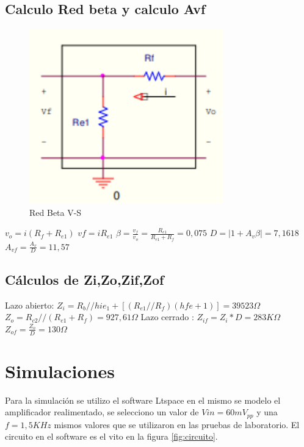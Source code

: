 \documentclass[12pt, letterpaper]{article}
\begin{document}
\subsection{Calculo Red beta y calculo Avf}
\begin{figure}[H]
	\centering
	\includegraphics[width=0.75\textwidth]{Imagenes/Screenshot_58.png}
	\caption{Red Beta  V-S}
	\label{fig:Red_beta}
\end{figure}
\singlespacing
$v_o=i(R_f+R_{e1})$ \hspace{1cm} $vf=iR_{e1}$
\singlespacing
$\beta = \frac{v_f}{v_o}=\frac{R_{e1}}{R_{e1}+R_f}=0,075$
\singlespacing
$D=|1+A_v\beta|=7,1618$ \hspace{1cm} $A_{vf}=\frac{A_v}{D}=11,57$
\subsection{Cálculos de Zi,Zo,Zif,Zof}
Lazo abierto:
$Z_i=R_b//{hie_1+[(R_{e1}//R_f)(hfe+1)]}=39523\Omega$
\singlespacing
$Z_o=R_{c2}//(R_{e1}+R_f)=927,61\Omega$
\singlespacing
Lazo cerrado :
$Z_{if}=Z_i*D=283K\Omega$
\singlespacing
$Z_{of}=\frac{Z_o}{D}=130\Omega$
\section{Simulaciones}
Para la simulación se utilizo el software Ltspace en el mismo se modelo el amplificador realimentado, se selecciono un valor de $Vin=60mV_{pp}$ y una $f=1,5KHz$ mismos valores que se utilizaron en las pruebas de laboratorio.
El circuito en el software es el vito en la figura \ref{fig:circuito}.
\end{document}
